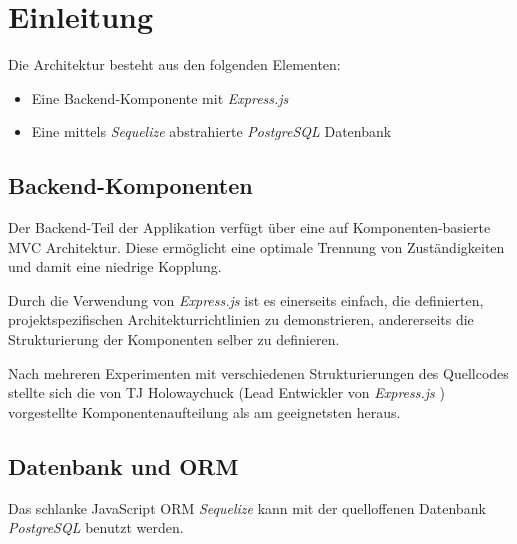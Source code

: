 \section{Einleitung}

Die Architektur besteht aus den folgenden Elementen:
\begin{itemize}
	\item Eine Backend-Komponente mit \emph{Express.js} \cite{Expressjs}
	\item Eine mittels \emph{Sequelize} \cite{Sequelize} abstrahierte
		\emph{PostgreSQL} \cite{PostgreSQL} Datenbank
\end{itemize}


\subsection{Backend-Komponenten}

Der Backend-Teil der Applikation verfügt über eine auf Komponenten-basierte
MVC Architektur. Diese ermöglicht eine optimale Trennung von Zuständigkeiten
\cite{SeparationOfConcerns} und damit eine niedrige Kopplung.

Durch die Verwendung von \emph{Express.js} \cite{Expressjs} ist es einerseits
einfach, die definierten, projektspezifischen Architekturrichtlinien zu
demonstrieren, andererseits die Strukturierung der Komponenten selber zu
definieren.

Nach mehreren Experimenten mit verschiedenen Strukturierungen des Quellcodes
stellte sich die von TJ Holowaychuck (Lead Entwickler von \emph{Express.js}
\cite{TJH}) vorgestellte Komponentenaufteilung \cite{TJH_ComponentStructure}
als am geeignetsten heraus.




\subsection{Datenbank und ORM}

Das schlanke JavaScript \gls{ORM} \emph{Sequelize} \cite{Sequelize} kann mit der
quelloffenen Datenbank \emph{PostgreSQL} \cite{PostgreSQL} benutzt werden.